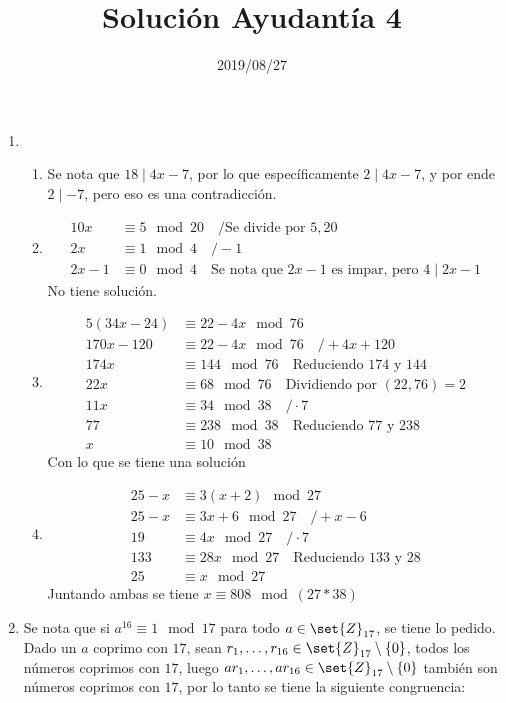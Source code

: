 \documentclass{ayudantia}
\title{Solución Ayudantía 4}
\date{2019/08/27}
\begin{document}
\maketitle
\begin{enumerate}
    \item \begin{enumerate}[label=\alph*)]
        \item Se nota que \(18\mid 4x-7\), por lo que específicamente \(2\mid 4x-7\), y por ende \(2\mid -7\), pero eso es una contradicción.
        \item \begin{align*}
            10x&\equiv 5\mod 20\quad/\text{Se divide por \(5,20\)}\\
            2x&\equiv 1\mod 4\quad/-1\\
            2x-1&\equiv 0\mod 4\quad\text{Se nota que \(2x-1\) es impar, pero \(4\mid 2x-1\)}
        \end{align*}
        No tiene solución.
        \item \begin{align*}
            5(34x-24)&\equiv 22-4x\mod 76\\
            170x-120&\equiv 22-4x\mod 76\quad/+4x+120\\
            174x&\equiv 144\mod 76\quad\text{Reduciendo \(174\) y \(144\)}\\
            22x&\equiv 68\mod 76\quad\text{Dividiendo por \((22,76)=2\)}\\
            11x&\equiv 34\mod 38\quad/\cdot 7\\
            77&\equiv 238\mod 38\quad\text{Reduciendo \(77\) y \(238\)}\\
            x&\equiv 10\mod 38
        \end{align*}
        Con lo que se tiene una solución
        \item \begin{align*}
            25-x&\equiv 3(x+2)\mod 27\\
            25-x&\equiv 3x+6\mod 27\quad/+x-6\\
            19&\equiv 4x\mod 27\quad/\cdot 7\\
            133&\equiv 28x\mod 27\quad\text{Reduciendo \(133\) y \(28\)}\\
            25 &\equiv x\mod 27
        \end{align*}
        Juntando ambas se tiene \(x\equiv 808 \mod (27*38)\)
    \end{enumerate}
    \item Se nota que si \(a^{16}\equiv 1\mod 17\) para todo \(a\in\set{Z}_{17}\), se tiene lo pedido. Dado un \(a\) coprimo con \(17\), sean \(r_1,\dots,r_{16}\in\set{Z}_{17}\setminus\{0\}\), todos los números coprimos con \(17\), luego \(ar_1,\dots,ar_{16}\in\set{Z}_{17}\setminus\{0\}\) también son números coprimos con \(17\), por lo tanto se tiene la siguiente congruencia:

\end{enumerate}
\end{document}
